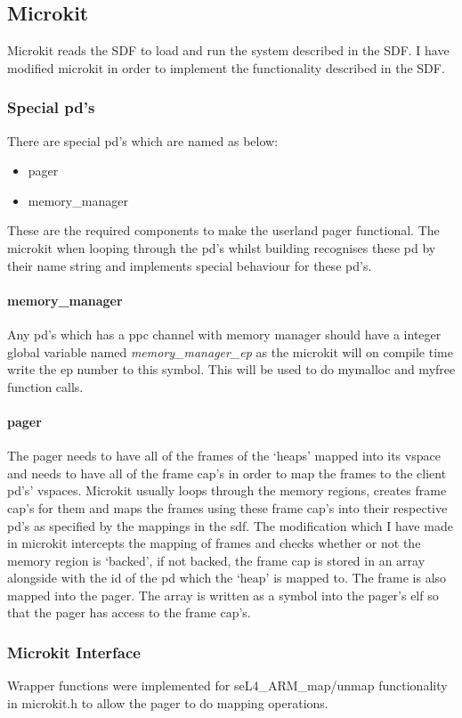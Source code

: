 \documentclass[../thesis.tex]{subfiles}
\begin{document}
\subsection{Microkit}
Microkit reads the SDF to load and run the system described in the SDF. I have modified microkit in order to implement the functionality described in the SDF.
\subsubsection{Special \gls{pd}'s}
There are special \gls{pd}'s which are named as below: \begin{itemize}
    \item pager
    \item memory\_manager
\end{itemize}
These are the required components to make the userland pager functional. The microkit when looping through the \gls{pd}'s whilst building recognises these \gls{pd} by their name string and implements special behaviour for these \gls{pd}'s.
\paragraph{memory\_manager}
Any \gls{pd}'s which has a ppc channel with memory manager should have a integer global variable named \textit{memory\_manager\_ep} as the microkit will on compile time write the ep number to this symbol. This will be used to do mymalloc and myfree function calls.
\paragraph{pager}
The pager needs to have all of the frames of the `heaps' mapped into its vspace and needs to have all of the frame \gls{cap}'s in order to map the frames to the client \gls{pd}'s' vspaces. Microkit usually loops through the memory regions, creates frame \gls{cap}'s for them and maps the frames using these frame \gls{cap}'s into their respective \gls{pd}'s as specified by the mappings in the sdf. The modification which I have made in microkit intercepts the mapping of frames and checks whether or not the memory region is `backed', if not backed, the frame \gls{cap} is stored in an array alongside with the id of the \gls{pd} which the `heap' is mapped to. The frame is also mapped into the pager. The array is written as a symbol into the pager's elf so that the pager has access to the frame \gls{cap}'s.
\subsubsection{Microkit Interface}
Wrapper functions were implemented for seL4\_ARM\_map/unmap functionality in microkit.h to allow the pager to do mapping operations.
\end{document}
